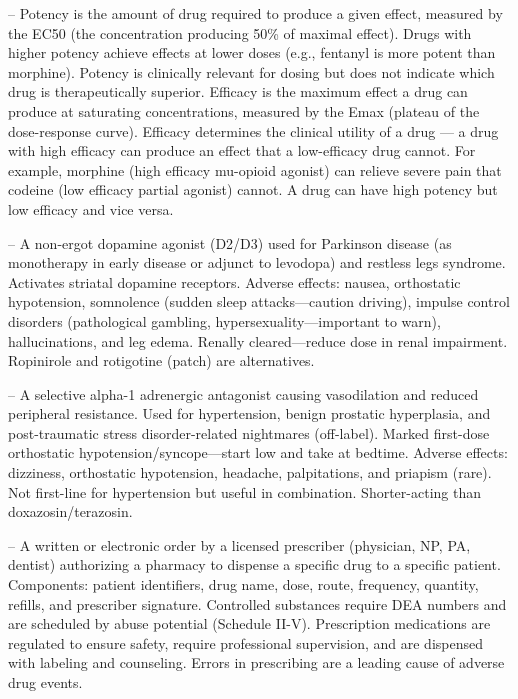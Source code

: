-- Potency is the amount of drug required to produce a given effect, measured by the EC50 (the concentration producing 50\% of maximal effect). Drugs with higher potency achieve effects at lower doses (e.g., fentanyl is more potent than morphine). Potency is clinically relevant for dosing but does not indicate which drug is therapeutically superior. Efficacy is the maximum effect a drug can produce at saturating concentrations, measured by the Emax (plateau of the dose-response curve). Efficacy determines the clinical utility of a drug — a drug with high efficacy can produce an effect that a low-efficacy drug cannot. For example, morphine (high efficacy mu-opioid agonist) can relieve severe pain that codeine (low efficacy partial agonist) cannot. A drug can have high potency but low efficacy and vice versa.

-- A non-ergot dopamine agonist (D2/D3) used for Parkinson disease (as monotherapy in early disease or adjunct to levodopa) and restless legs syndrome. Activates striatal dopamine receptors. Adverse effects: nausea, orthostatic hypotension, somnolence (sudden sleep attacks—caution driving), impulse control disorders (pathological gambling, hypersexuality—important to warn), hallucinations, and leg edema. Renally cleared—reduce dose in renal impairment. Ropinirole and rotigotine (patch) are alternatives.

-- A selective alpha-1 adrenergic antagonist causing vasodilation and reduced peripheral resistance. Used for hypertension, benign prostatic hyperplasia, and post-traumatic stress disorder-related nightmares (off-label). Marked first-dose orthostatic hypotension/syncope—start low and take at bedtime. Adverse effects: dizziness, orthostatic hypotension, headache, palpitations, and priapism (rare). Not first-line for hypertension but useful in combination. Shorter-acting than doxazosin/terazosin.

-- A written or electronic order by a licensed prescriber (physician, NP, PA, dentist) authorizing a pharmacy to dispense a specific drug to a specific patient. Components: patient identifiers, drug name, dose, route, frequency, quantity, refills, and prescriber signature. Controlled substances require DEA numbers and are scheduled by abuse potential (Schedule II-V). Prescription medications are regulated to ensure safety, require professional supervision, and are dispensed with labeling and counseling. Errors in prescribing are a leading cause of adverse drug events.

